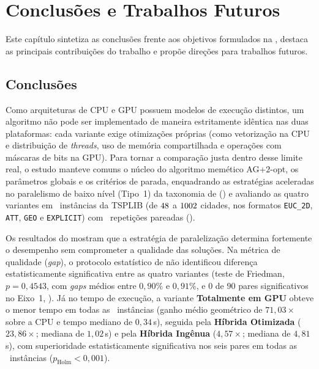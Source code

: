 \chapter{Conclusões e Trabalhos Futuros}\label{cap6-conclusoes}

Este capítulo sintetiza as conclusões frente aos objetivos formulados na , destaca as principais contribuições do trabalho e propõe direções para trabalhos futuros.

\section{Conclusões}\label{sec-61-conclusoes}

Como arquiteturas de CPU e GPU possuem modelos de execução distintos, um algoritmo não pode ser implementado de maneira estritamente idêntica nas duas plataformas: cada variante exige otimizações próprias (como vetorização na CPU e distribuição de \emph{threads}, uso de memória compartilhada e operações com máscaras de bits na GPU).
Para tornar a comparação justa dentro desse limite real, o estudo manteve comuns o núcleo do algoritmo memético AG+\(2\)-opt, os parâmetros globais e os critérios de parada, enquadrando as estratégias aceleradas no paralelismo de baixo nível (Tipo~1) da taxonomia de \textcite{crainic2003parallel,crainic2010parallel} () e avaliando as quatro variantes em \totalinstancias\ instâncias da TSPLIB (de \(48\) a \(1002\) cidades, nos formatos \texttt{EUC\_2D}, \texttt{ATT}, \texttt{GEO} e \texttt{EXPLICIT}) com \totalrepeticoes\ repetições pareadas ().

Os resultados do  mostram que a estratégia de paralelização determina fortemente o desempenho sem comprometer a qualidade das soluções.
Na métrica de qualidade (\emph{gap}), o protocolo estatístico de \textcite{demsar2006statistical} não identificou diferença estatisticamente significativa entre as quatro variantes (teste de Friedman, \(p = 0{,}4543\), com \emph{gaps} médios entre \(0{,}90\%\) e \(0{,}91\%\), e \(0\) de \(90\) pares significativos no Eixo~1, ).
Já no tempo de execução, a variante \textbf{Totalmente em GPU} obteve o menor tempo em todas as \totalinstancias\ instâncias (ganho médio geométrico de \(71{,}03\times\) sobre a CPU e tempo mediano de \(0{,}34\)\,s), seguida pela \textbf{Híbrida Otimizada} (\(23{,}86\times\); mediana de \(1{,}02\)\,s) e pela \textbf{Híbrida Ingênua} (\(4{,}57\times\); mediana de \(4{,}81\)\,s), com superioridade estatisticamente significativa nos seis pares em todas as \totalinstancias\ instâncias (\(p_{\text{Holm}} < 0{,}001\)).

